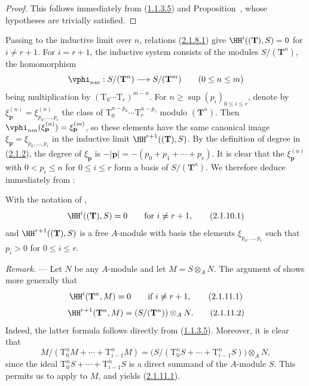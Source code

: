 \begin{proof}
This follows immediately from (\hyperref[III.1.1.3.5]{1.1.3.5}) and Proposition~, whose hypotheses are trivially satisfied.
\end{proof}

\begin{env}[2.1.9]
\label{III.2.1.9}
Passing to the inductive limit over $n$, relations (\hyperref[III.2.1.8.1]{2.1.8.1}) give $\HH^i((\mathbf{T}),S)=0$ for $i\neq r+1$.
For $i=r+1$, the inductive system consists of the modules $S/(\mathbf{T}^n)$, the homomorphism
\[
  \vphi_{nm}:S/(\mathbf{T}^n)\longrightarrow S/(\mathbf{T}^m)
  \qquad (0\leq n\leq m)
\]
being multiplication by $(\mathrm{T}_0\cdots\mathrm{T}_r)^{m-n}$.
For $n\geq\sup(p_i)_{0\leq i\leq r}$, denote by $\xi_{\mathbf{p}}^{(n)}=\xi_{p_0,\dots,p_r}^{(n)}$ the class of $\mathrm{T}_0^{n-p_0}\cdots\mathrm{T}_r^{n-p_r}$ modulo $(\mathbf{T}^n)$.
Then $\vphi_{nm}(\xi_{\mathbf{p}}^{(n)})=\xi_{\mathbf{p}}^{(m)}$, so these elements have the same canonical image $\xi_{\mathbf{p}}=\xi_{p_0,\dots,p_r}$ in the inductive limit $\HH^{r+1}((\mathbf{T}),S)$.
By the definition of degree in (\hyperref[III.2.1.2]{2.1.2}), the degree of $\xi_{\mathbf{p}}$ is $-|\mathbf{p}|=-(p_0+p_1+\cdots+p_r)$.
It is clear that the $\xi_{\mathbf{p}}^{(n)}$ with $0<p_i\leq n$ for $0\leq i\leq r$ form a basis of $S/(\mathbf{T}^n)$.
We therefore deduce immediately from :
\end{env}

\begin{corollary}[2.1.10]
\label{III.2.1.10}
With the notation of ,
\[
\label{III.2.1.10.1}
  \HH^i((\mathbf{T}),S)=0
  \qquad\text{for }i\neq r+1,
  \tag{2.1.10.1}
\]
and $\HH^{r+1}((\mathbf{T}),S)$ is a free $A$-module with basis the elements $\xi_{p_0,\dots,p_r}$ such that $p_i>0$ for $0\leq i\leq r$.
\end{corollary}

\begin{env}[2.1.11]
\label{III.2.1.11}
\emph{Remark.} ---
Let $N$ be any $A$-module and let $M=S\otimes_A N$.
The argument of  shows more generally that
\[
\label{III.2.1.11.1}
  \HH^i(\mathbf{T}^n,M)=0
  \qquad\text{if }i\neq r+1,
  \tag{2.1.11.1}
\]
\[
\label{III.2.1.11.2}
  \HH^{r+1}(\mathbf{T}^n,M)=(S/(\mathbf{T}^n))\otimes_A N.
  \tag{2.1.11.2}
\]
Indeed, the latter formula follows directly from (\hyperref[III.1.1.3.5]{1.1.3.5}).
Moreover, it is clear that
\[
  M/(\mathrm{T}_0^nM+\cdots+\mathrm{T}_{i-1}^nM)
  =\bigl(S/(\mathrm{T}_0^nS+\cdots+\mathrm{T}_{i-1}^nS)\bigr)\otimes_A N,
\]
since the ideal $\mathrm{T}_0^nS+\cdots+\mathrm{T}_{i-1}^nS$ is a direct summand of the $A$-module $S$.
This permits us to apply  to $M$, and yields (\hyperref[III.2.1.11.1]{2.1.11.1}).
\end{env}


